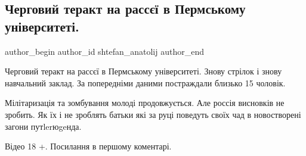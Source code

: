  
 
 
 
 
 
\subsection{Черговий теракт на рассєї в Пермському університеті.}
\label{sec:20_09_2021.fb.shtefan_anatolij.1.terakt_permj}
 
\ifcmt
 author_begin
   author_id shtefan_anatolij
 author_end
\fi

Черговий теракт на рассєї в Пермському університеті. Знову стрілок і знову
навчальний заклад. За попередніми даними постраждали близько 15 чоловік. 

Мілітаризація та зомбування молоді продовжується. Але россія висновків не
зробить. Як їх і не зроблять батьки які за руці поведуть своїх чад в
новостворені загони путlerюgeнда. 

Відео 18 +. Посилання в першому коментарі.

